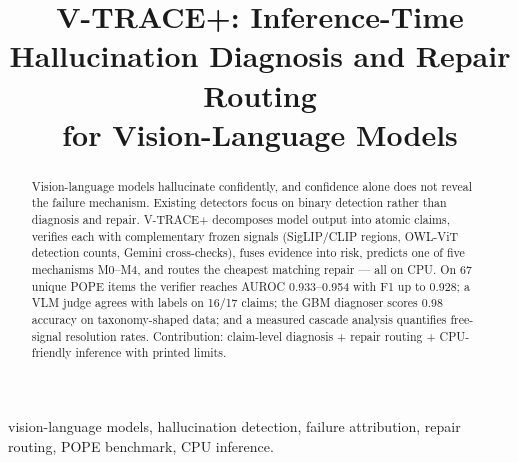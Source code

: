 \documentclass[conference]{IEEEtran}
\begin{document}
\title{V-TRACE+: Inference-Time Hallucination Diagnosis and Repair Routing\\
for Vision-Language Models}

\author{
}

\maketitle

\begin{abstract}
Vision-language models hallucinate confidently, and confidence alone does not
reveal the failure mechanism. Existing detectors focus on binary detection
rather than diagnosis and repair. V-TRACE+ decomposes model output into atomic
claims, verifies each with complementary frozen signals (SigLIP/CLIP regions,
OWL-ViT detection counts, Gemini cross-checks), fuses evidence into risk,
predicts one of five mechanisms M0--M4, and routes the cheapest matching
repair --- all on CPU. On 67 unique POPE items the verifier reaches AUROC
0.933--0.954 with F1 up to 0.928; a VLM judge agrees with labels on 16/17
claims; the GBM diagnoser scores 0.98 accuracy on taxonomy-shaped data; and a
measured cascade analysis quantifies free-signal resolution rates. Contribution:
claim-level diagnosis + repair routing + CPU-friendly inference with printed
limits.
\end{abstract}

\begin{IEEEkeywords}
vision-language models, hallucination detection, failure attribution, repair
routing, POPE benchmark, CPU inference.
\end{IEEEkeywords}
\end{document}
